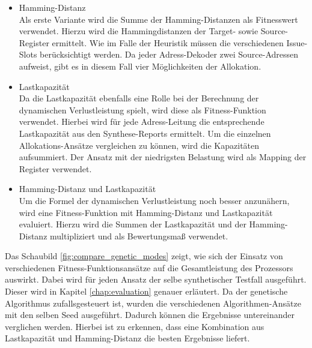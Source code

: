 \begin{itemize}
	\item Hamming-Distanz\\
		Als erste Variante wird die Summe der Hamming-Distanzen als Fitnesswert verwendet. Hierzu wird die Hammingdistanzen der Target- sowie Source-Register ermittelt. Wie im Falle der Heuristik müssen die verschiedenen Issue-Slots berücksichtigt werden. Da jeder Adress-Dekoder zwei Source-Adressen aufweist, gibt es in diesem Fall vier Möglichkeiten der Allokation.
	\item Lastkapazität\\
		Da die Lastkapazität ebenfalls eine Rolle bei der Berechnung der dynamischen Verlustleistung spielt, wird diese als Fitness-Funktion verwendet. Hierbei wird für jede Adress-Leitung die entsprechende Lastkapazität aus den Synthese-Reports ermittelt. Um die einzelnen Allokations-Ansätze vergleichen zu können, wird die Kapazitäten aufsummiert. Der Ansatz mit der niedrigsten Belastung wird als Mapping der Register verwendet. \\
	\item Hamming-Distanz und Lastkapazität\\
		Um die Formel der dynamischen Verlustleistung noch besser anzunähern, wird eine Fitness-Funktion mit Hamming-Distanz und Lastkapazität evaluiert. Hierzu wird die Summen der Lastkapazität und der Hamming-Distanz multipliziert und als Bewertungsmaß verwendet.
\end{itemize}

Das Schaubild \ref{fig:compare_genetic_modes} zeigt, wie sich der Einsatz von verschiedenen Fitness-Funktionsansätze auf die Gesamtleistung des Prozessors auswirkt. Dabei wird für jeden Ansatz der selbe synthetischer Testfall ausgeführt. Dieser wird in Kapitel \ref{chap:evaluation} genauer erläutert. Da der genetische Algorithmus zufallsgesteuert ist, wurden die verschiedenen Algorithmen-Ansätze mit den selben Seed ausgeführt. Dadurch können die Ergebnisse untereinander verglichen werden. Hierbei ist zu erkennen, dass eine Kombination aus Lastkapazität und Hamming-Distanz die besten Ergebnisse liefert. 

